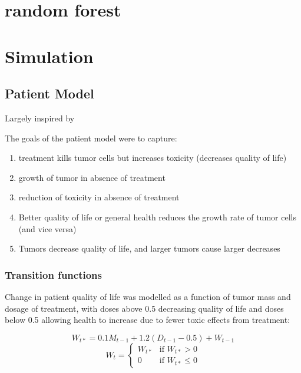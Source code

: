 \documentclass[12pt]{article}
\begin{document}

\section{random forest} %
\label{sec:random_forest}


\section{Simulation}

\subsection{Patient Model} %
\label{sub:vpm}

Largely inspired by \cite{paper}

The goals of the patient model were to capture:

\begin{enumerate}
  \item treatment kills tumor cells but increases toxicity (decreases quality of life)
  \item growth of tumor in absence of treatment
  \item reduction of toxicity in absence of treatment
  \item Better quality of life or general health reduces the growth rate of tumor cells (and vice versa)
  \item Tumors decrease quality of life, and larger tumors cause larger decreases
\end{enumerate} 

\subsubsection{Transition functions} %
\label{ssub:transition_functions}



Change in patient quality of life was modelled as a function of tumor mass and dosage of treatment, with doses above 0.5 decreasing quality of life and doses below 0.5 allowing health to increase due to fewer toxic effects from treatment:

\begin{equation}
W_{t*} = 0.1 M_{t-1} + 1.2 (D_{t-1} - 0.5) + W_{t - 1}
\end{equation}
\begin{equation}
W_{t} = \begin{cases}
  W_{t*} &\text{if } W_{t*} > 0 \\
  0 &\text{if } W_{t*} \leq 0
\end{cases}
\end{equation}
\end{document}
